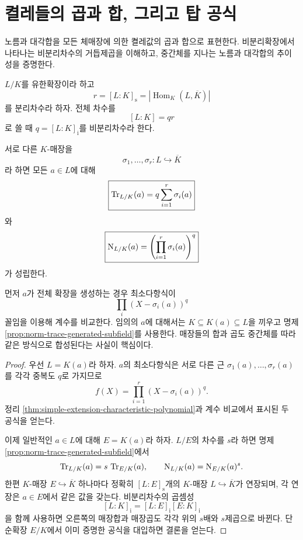 \clearpage
\section{켤레들의 곱과 합, 그리고 탑 공식}
\label{sec:norm-trace-embeddings-towers}

\begin{learninggoal}
노름과 대각합을 모든 체매장에 의한 켤레값의 곱과 합으로 표현한다. 비분리확장에서 나타나는 비분리차수의 거듭제곱을 이해하고, 중간체를 지나는 노름과 대각합의 추이성을 증명한다.
\end{learninggoal}

$L/K$를 유한확장이라 하고
\[
  r=[L:K]_{\mathrm s}
  =|\operatorname{Hom}_K(L,\overline K)|
\]
를 분리차수라 하자. 전체 차수를
\[
  [L:K]=qr
\]
로 쓸 때 $q=[L:K]_{\mathrm i}$를 비분리차수라 한다.

\begin{theorem}
\label{thm:norm-trace-embedding-formulas}
서로 다른 $K$-매장을
\[
  \sigma_1,\dots,\sigma_r:L\hookrightarrow\overline K
\]
라 하면 모든 $a\in L$에 대해
\[
  \boxed{
  \operatorname{Tr}_{L/K}(a)
  =q\sum_{i=1}^r\sigma_i(a)}
\]
와
\[
  \boxed{
  \operatorname{N}_{L/K}(a)
  =\left(\prod_{i=1}^r\sigma_i(a)\right)^q}
\]
가 성립한다.
\end{theorem}

\begin{proofidea}
먼저 $a$가 전체 확장을 생성하는 경우 최소다항식이
\[
  \prod_i(X-\sigma_i(a))^q
\]
꼴임을 이용해 계수를 비교한다. 임의의 $a$에 대해서는
$K\subseteq K(a)\subseteq L$을 끼우고
명제 \ref{prop:norm-trace-generated-subfield}를 사용한다.
매장들의 합과 곱도 중간체를 따라 같은 방식으로 합성된다는 사실이 핵심이다.
\end{proofidea}

\begin{proof}
우선 $L=K(a)$라 하자. $a$의 최소다항식은 서로 다른 근
$\sigma_1(a),\dots,\sigma_r(a)$를 각각 중복도 $q$로 가지므로
\[
  f(X)=\prod_{i=1}^r
  (X-\sigma_i(a))^q.
\]
정리 \ref{thm:simple-extension-characteristic-polynomial}과 계수 비교에서
표시된 두 공식을 얻는다.

이제 일반적인 $a\in L$에 대해 $E=K(a)$라 하자. $L/E$의 차수를 $s$라 하면
명제 \ref{prop:norm-trace-generated-subfield}에서
\[
  \operatorname{Tr}_{L/K}(a)=s\,\operatorname{Tr}_{E/K}(a),
  \qquad
  \operatorname{N}_{L/K}(a)=\operatorname{N}_{E/K}(a)^s.
\]
한편 $K$-매장 $E\hookrightarrow\overline K$ 하나마다 정확히
$[L:E]_{\mathrm s}$개의 $K$-매장 $L\hookrightarrow\overline K$가 연장되며,
각 연장은 $a\in E$에서 같은 값을 갖는다. 비분리차수의 곱셈성
\[
  [L:K]_{\mathrm i}
  =[L:E]_{\mathrm i}[E:K]_{\mathrm i}
\]
을 함께 사용하면 오른쪽의 매장합과 매장곱도 각각 위의
$s$배와 $s$제곱으로 바뀐다. 단순확장 $E/K$에서 이미 증명한 공식을
대입하면 결론을 얻는다.
\end{proof}

